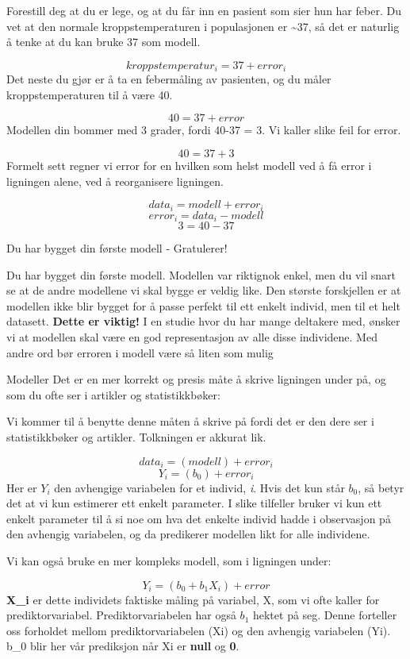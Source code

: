 \documentclass[
]{book}
\begin{document}
Forestill deg at du er lege, og at du får inn en pasient som sier hun har feber. Du vet at den normale kroppstemperaturen i populasjonen er \textasciitilde37, så det er naturlig å tenke at du kan bruke 37 som modell.

\[
kroppstemperatur_i = 37 + error_i
\]
Det neste du gjør er å ta en febermåling av pasienten, og du måler kroppstemperaturen til å være 40.

\[
40 = 37 + error
\]
Modellen din bommer med 3 grader, fordi 40-37 = 3. Vi kaller slike feil for error.

\[
40 = 37 + 3
\]
Formelt sett regner vi error for en hvilken som helst modell ved å få error i ligningen alene, ved å reorganisere ligningen.

\[
data_i = modell + error_i
\]
\[
error_i = data_i - modell
\]
\[
3 = 40 - 37
\]

{Du har bygget din første modell - Gratulerer!}

Du har bygget din første modell. Modellen var riktignok enkel, men du vil snart se at de andre modellene vi skal bygge er veldig like. Den største forskjellen er at modellen ikke blir bygget for å passe perfekt til ett enkelt individ, men til et helt datasett. \textbf{Dette er viktig!} I en studie hvor du har mange deltakere med, ønsker vi at modellen skal være en god representasjon av alle disse individene. Med andre ord bør erroren i modell være så liten som mulig

{Modeller}
Det er en mer korrekt og presis måte å skrive ligningen under på, og som du ofte ser i artikler og statistikkbøker:

Vi kommer til å benytte denne måten å skrive på fordi det er den dere ser i statistikkbøker og artikler. Tolkningen er akkurat lik.

\[
data_i = (modell) + error_i
\]
\[
Y_i = (b_0) + error_i
\]
Her er \(Y_i\) den avhengige variabelen for et individ, \emph{i}. Hvis det kun står \(b_0\), så betyr det at vi kun estimerer ett enkelt parameter. I slike tilfeller bruker vi kun ett enkelt parameter til å si noe om hva det enkelte individ hadde i observasjon på den avhengig variabelen, og da predikerer modellen likt for alle individene.

Vi kan også bruke en mer kompleks modell, som i ligningen under:

\[
Y_i = (b_0 + b_1X_i) + error
\]
\textbf{X\_i} er dette individets faktiske måling på variabel, X, som vi ofte kaller for prediktorvariabel. Prediktorvariabelen har også \(b_1\) hektet på seg. Denne forteller oss forholdet mellom prediktorvariabelen (Xi) og den avhengig variabelen (Yi). b\_0 blir her vår prediksjon når Xi er \textbf{null} og \textbf{0}.
\end{document}
